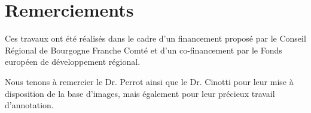 \documentclass{gretsi}
\begin{document}
\begin{sloppypar}
\section*{Remerciements}
Ces travaux ont été réalisés dans le cadre d'un financement proposé par le Conseil Régional de Bourgogne Franche Comté et d'un co-financement par le Fonds européen de développement régional.\par
Nous tenons à remercier le Dr. Perrot ainsi que le Dr. Cinotti pour leur mise à disposition de la base d'images, mais également pour leur précieux travail d'annotation.

 
\end{sloppypar}
\end{document}
